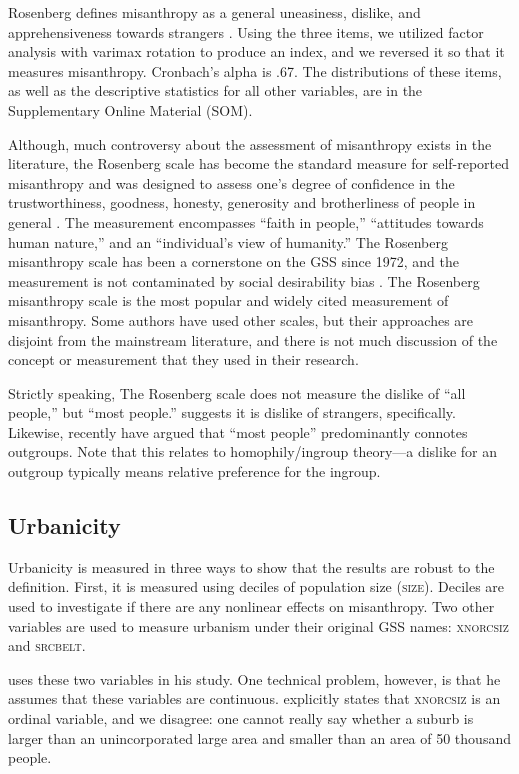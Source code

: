 \documentclass[11pt, letterpaper]{article}
\begin{document}
\begin{spacing}{1.4}
Rosenberg defines misanthropy as a general uneasiness, dislike, and
apprehensiveness towards strangers \citep{rosenberg56}. Using the three items,
we utilized factor analysis with varimax rotation to produce an index, and we
reversed it so that it measures misanthropy. Cronbach's alpha is .67. The
distributions of these items, as well as the descriptive statistics for all other variables, are in the Supplementary Online Material (SOM).

 Although, much controversy about the assessment of misanthropy exists in the
 literature, the Rosenberg scale has become the standard measure for
 self-reported misanthropy and was designed to assess one's degree of confidence
 in the trustworthiness, goodness, honesty, generosity and brotherliness of
 people in general \citep{rosenberg56}. The measurement encompasses ``faith in
 people,'' ``attitudes towards human nature,'' and an ``individual's view of
 humanity.'' The Rosenberg misanthropy scale has been a cornerstone on the GSS since 1972, and the measurement is not contaminated by social desirability bias \citep{ray81}. 
 The Rosenberg misanthropy scale is the most popular and widely cited measurement of misanthropy. Some authors \citep[e.g.,][]{wuensch2002misanthropy} have used other scales, but their approaches are disjoint from the mainstream literature, and there is not much discussion of the concept or measurement that they used in their research.  

Strictly speaking, The Rosenberg scale does not measure the dislike of ``all people,'' but  ``most people.'' \citet{wilson85} suggests it is dislike of strangers, specifically. Likewise, recently \citet{delhey11} have argued that ``most people'' predominantly connotes outgroups. Note that this relates to homophily/ingroup theory---a dislike for an outgroup typically means relative preference for the ingroup. 

 
\subsection*{Urbanicity}

Urbanicity is measured in three ways to show that the
results are robust to the definition. First, it is measured using deciles of population size
(\textsc{size}). Deciles are used to investigate if there are any nonlinear
effects on misanthropy. Two other variables are used to measure urbanism under
their original GSS names: \textsc{xnorcsiz} and \textsc{srcbelt}.

{\citet{wilson85} uses these two variables in his study. One technical problem,
  however, is that he assumes that these variables are
  continuous. \citet{wilson85} explicitly states that \textsc{xnorcsiz} is an ordinal
  variable, and we disagree: one cannot really say whether a suburb is larger
  than an unincorporated large area and smaller than an area of 50 thousand
  people.}


\end{spacing}
\end{document}
